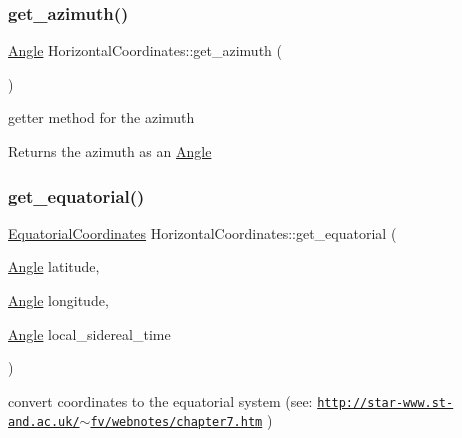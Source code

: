 \subsubsection{\texorpdfstring{get\+\_\+azimuth()}{get\_azimuth()}}
{\footnotesize\ttfamily \mbox{\hyperlink{classAngle}{Angle}} Horizontal\+Coordinates\+::get\+\_\+azimuth (\begin{DoxyParamCaption}{ }\end{DoxyParamCaption})}



getter method for the azimuth 

\begin{DoxyReturn}{Returns}
the azimuth as an \mbox{\hyperlink{classAngle}{Angle}} 
\end{DoxyReturn}
\mbox{\label{classHorizontalCoordinates_a1513f50fc1bdd2ded9934e783ada4e86}} 
\subsubsection{\texorpdfstring{get\+\_\+equatorial()}{get\_equatorial()}}
{\footnotesize\ttfamily \mbox{\hyperlink{classEquatorialCoordinates}{Equatorial\+Coordinates}} Horizontal\+Coordinates\+::get\+\_\+equatorial (\begin{DoxyParamCaption}\item[{\mbox{\hyperlink{classAngle}{Angle}}}]{latitude,  }\item[{\mbox{\hyperlink{classAngle}{Angle}}}]{longitude,  }\item[{\mbox{\hyperlink{classAngle}{Angle}}}]{local\+\_\+sidereal\+\_\+time }\end{DoxyParamCaption})}



convert coordinates to the equatorial system (see\+: \href{http://star-www.st-and.ac.uk/~fv/webnotes/chapter7.htm}{\tt http\+://star-\/www.\+st-\/and.\+ac.\+uk/$\sim$fv/webnotes/chapter7.\+htm} ) 


